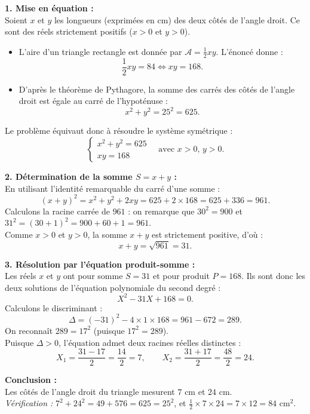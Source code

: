 \documentclass[11pt,a4paper]{article}
\begin{document}
\begin{correctionbox}
\textbf{1. Mise en équation :}\\
Soient $x$ et $y$ les longueurs (exprimées en $\text{cm}$) des deux côtés de l'angle droit. Ce sont des réels strictement positifs ($x > 0$ et $y > 0$).
\begin{itemize}[leftmargin=*,label=\textbullet]
    \item L'aire d'un triangle rectangle est donnée par $\mathcal{A} = \frac{1}{2}xy$. L'énoncé donne :
    \[
    \frac{1}{2}xy = 84 \iff xy = 168.
    \]
    \item D'après le théorème de Pythagore, la somme des carrés des côtés de l'angle droit est égale au carré de l'hypoténuse :
    \[
    x^2 + y^2 = 25^2 = 625.
    \]
\end{itemize}
Le problème équivaut donc à résoudre le système symétrique :
\[
\begin{cases}
x^2 + y^2 = 625 \\
xy = 168
\end{cases}
\quad \text{avec } x > 0, \, y > 0.
\]

\textbf{2. Détermination de la somme $S = x + y$ :}\\
En utilisant l'identité remarquable du carré d'une somme :
\[
(x + y)^2 = x^2 + y^2 + 2xy = 625 + 2 \times 168 = 625 + 336 = 961.
\]
Calculons la racine carrée de $961$ : on remarque que $30^2 = 900$ et $31^2 = (30+1)^2 = 900 + 60 + 1 = 961$.\\
Comme $x > 0$ et $y > 0$, la somme $x+y$ est strictement positive, d'où :
\[
x + y = \sqrt{961} = 31.
\]

\textbf{3. Résolution par l'équation produit-somme :}\\
Les réels $x$ et $y$ ont pour somme $S = 31$ et pour produit $P = 168$. Ils sont donc les deux solutions de l'équation polynomiale du second degré :
\[
X^2 - 31X + 168 = 0.
\]
Calculons le discriminant :
\[
\Delta = (-31)^2 - 4 \times 1 \times 168 = 961 - 672 = 289.
\]
On reconnaît $289 = 17^2$ (puisque $17^2 = 289$).\\
Puisque $\Delta > 0$, l'équation admet deux racines réelles distinctes :
\[
X_1 = \frac{31 - 17}{2} = \frac{14}{2} = 7, \qquad X_2 = \frac{31 + 17}{2} = \frac{48}{2} = 24.
\]

\textbf{Conclusion :}\\
Les côtés de l'angle droit du triangle mesurent \textbf{$7\text{ cm}$} et \textbf{$24\text{ cm}$}.\\
\textit{Vérification :} $7^2 + 24^2 = 49 + 576 = 625 = 25^2$, et $\frac{1}{2} \times 7 \times 24 = 7 \times 12 = 84\text{ cm}^2$.
\end{correctionbox}
\end{document}
